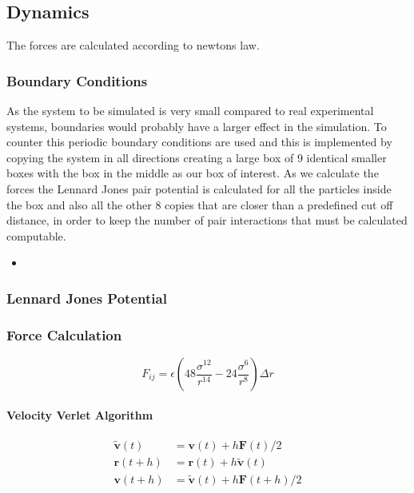 \documentclass[
10pt, %
a4paper, %
oneside, %
headinclude,footinclude, %
BCOR5mm, %
]{scrartcl}
\newcommand{\insertcode}[2]{\begin{itemize}\item[]\end{itemize}} %
\begin{document}
\subsection{Dynamics}

The forces are calculated according to newtons law.


\subsubsection{Boundary Conditions}
As the system to be simulated is very small compared to real experimental systems, boundaries would probably have a larger effect in the simulation. To counter this periodic boundary conditions are used and this is implemented by copying the system in all directions creating a large box of 9 identical smaller boxes with the box in the middle as our box of interest. As we calculate the forces the Lennard Jones pair potential is calculated for all the particles inside the box and also all the other 8 copies that are closer than a predefined cut off distance, in order to keep the number of pair interactions that must be calculated computable. 

\insertcode{"Scripts/boundary_conditions_snippet_1.f90"}{Creating periodic boundary conditions} %





\subsubsection{Lennard Jones Potential}

 
\subsubsection{Force Calculation}

$$ F_{ij} = \epsilon \left ( 48 \frac{\sigma^{12}}{r^{14}} - 24 \frac{\sigma^6}{r^8} \right ) \Delta r $$

\paragraph{Velocity Verlet Algorithm}

\begin{align}
\tilde{\mathbf{v}}(t) &=  \mathbf{v}(t) + h \mathbf{F}(t)/2 \\
\mathbf{r}(t+h) &= \mathbf{r}(t) + h\tilde{\mathbf{v}}(t) \\
\mathbf{v}(t+h) &= \tilde{\mathbf{v}}(t) + h \mathbf{F}(t+h)/2 
\end{align}
\end{document}
